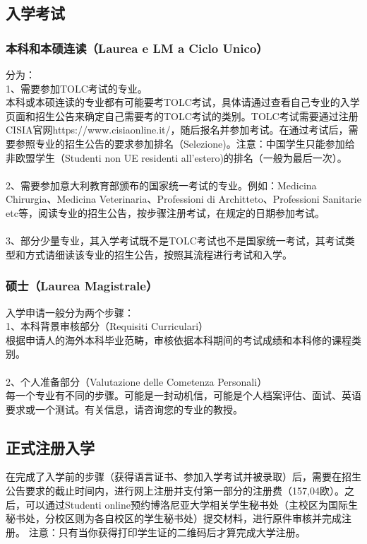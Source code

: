 \subsection{入学考试}

\subsubsection{本科和本硕连读（Laurea e LM a Ciclo Unico）}
分为：\\
1、需要参加TOLC考试的专业。\\
本科或本硕连读的专业都有可能要考TOLC考试，具体请通过查看自己专业的入学页面和招生公告来确定自己需要考的TOLC考试的类别。TOLC考试需要通过注册CISIA官网https://www.cisiaonline.it/，随后报名并参加考试。在通过考试后，需要参照专业的招生公告的要求参加排名（Selezione)。注意：中国学生只能参加给非欧盟学生（Studenti non UE residenti all'estero)的排名（一般为最后一次）。\\
\\
2、需要参加意大利教育部颁布的国家统一考试的专业。例如：Medicina Chirurgia、Medicina Veterinaria、Professioni di Architteto、Professioni Sanitarie etc等，阅读专业的招生公告，按步骤注册考试，在规定的日期参加考试。\\
\\
3、部分少量专业，其入学考试既不是TOLC考试也不是国家统一考试，其考试类型和方式请细读该专业的招生公告，按照其流程进行考试和入学。

\subsubsection{硕士（Laurea Magistrale）}
入学申请一般分为两个步骤：\\
1、本科背景审核部分（Requisiti Curriculari）\\ 
根据申请人的海外本科毕业范畴，审核依据本科期间的考试成绩和本科修的课程类别。\\
\\
2、个人准备部分（Valutazione delle Cometenza Personali）\\
每一个专业有不同的步骤。可能是一封动机信，可能是个人档案评估、面试、英语要求或一个测试。有关信息，请咨询您的专业的教授。


\subsection{正式注册入学}
在完成了入学前的步骤（获得语言证书、参加入学考试并被录取）后，需要在招生公告要求的截止时间内，进行网上注册并支付第一部分的注册费（157,04欧）。之后，可以通过Studenti online预约博洛尼亚大学相关学生秘书处（主校区为国际生秘书处，分校区则为各自校区的学生秘书处）提交材料，进行原件审核并完成注册。
注意：只有当你获得打印学生证的二维码后才算完成大学注册。
\\

